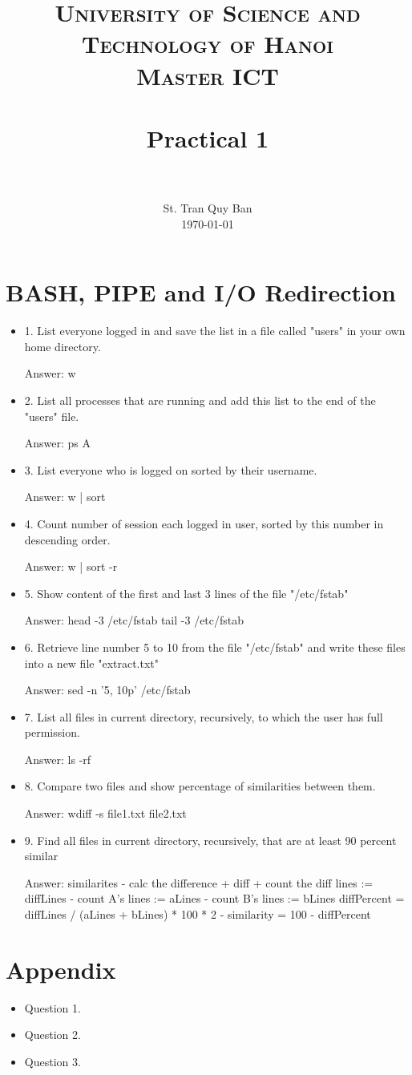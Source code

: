 \documentclass[paper=a4, fontsize=11pt]{scrartcl}
\title{
		\usefont{OT1}{bch}{b}{n}
		\normalfont \normalsize \textsc{University of Science and Technology of Hanoi \\ Master ICT} \\ [25pt]
		\horrule{0.5pt} \\[0.4cm]
		\huge Practical 1 \\
		\horrule{2pt} \\[0.5cm]
}
\author{
		\normalfont 								\normalsize
        St. Tran Quy Ban\\[-3pt]		\normalsize
        \today
}
\date{}
\numberwithin{equation}{section}		%
\numberwithin{figure}{section}			%
\numberwithin{table}{section}				%
\begin{document}
\maketitle

\section{BASH, PIPE and I/O Redirection}

\begin{itemize}
	\item 1. List everyone logged in and save the list in a file called "users" in your own home directory.
	
	Answer: w
	\item 2. List all processes that are running and add this list to the end of the "users" file.
	
	Answer: ps A
	\item 3. List everyone who is logged on sorted by their username.
	
	Answer: w | sort
	\item 4. Count number of session each logged in user, sorted by this number in descending order.
	
	Answer: w | sort -r
	\item 5. Show content of the first and last 3 lines of the file "/etc/fstab"
	
	Answer:  
	head -3 /etc/fstab
	tail -3 /etc/fstab
	
	\item 6. Retrieve line number 5 to 10 from the file "/etc/fstab" and write these files into a new file "extract.txt"
	
	Answer: sed -n '5, 10p' /etc/fstab
	\item 7. List all files in current directory, recursively, to which the user has full permission.
	
	Answer: ls -rf
	\item 8. Compare two files and show percentage of similarities between them.
	
	Answer: wdiff -s file1.txt file2.txt
	\item 9. Find all files in current directory, recursively, that are at least 90 percent similar
	
	Answer:  
	similarites
	- calc the difference
	 + diff
	 + count the diff lines := diffLines
    - count A's lines := aLines
    - count B's lines := bLines
    diffPercent = diffLines / (aLines + bLines) * 100 * 2
    - similarity = 100 - diffPercent
    
   
\end{itemize}

\section{Appendix}

\begin{itemize}
	\item Question 1.
	
	
	\item Question 2.
	
	
	\item Question 3.
\end{itemize}

\end{document}
